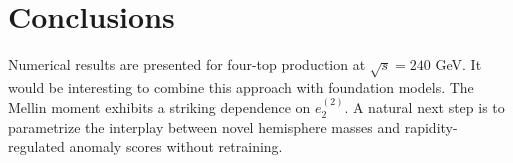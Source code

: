 \section{Conclusions}\label{sec:conclusions}

Numerical results are presented for four-top production at $\sqrt{s} =
240$ GeV. It would be interesting to combine this approach with
foundation models. The Mellin moment exhibits a striking dependence on
$e_2^{(2)}$. A natural next step is to parametrize the interplay between
novel hemisphere masses and rapidity-regulated anomaly scores without
retraining.


